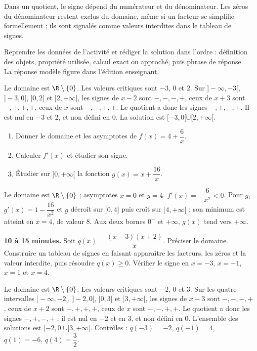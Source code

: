 \begin{summary}Dans un quotient, le signe dépend du numérateur et du dénominateur. Les zéros du dénominateur restent exclus du domaine, même si un facteur se simplifie formellement ; ils sont signalés comme valeurs interdites dans le tableau de signes.\end{summary}

\begin{example}
Reprendre les données de l'activité et rédiger la solution dans l'ordre : définition des objets, propriété utilisée, calcul exact ou approché, puis phrase de réponse. La réponse modèle figure dans l'édition enseignant.
\end{example}
\begin{solution}Le domaine est $\R\setminus\{0\}$. Les valeurs critiques sont $-3$, $0$ et $2$. Sur $]-\infty,-3[$, $]-3,0[$, $]0,2[$ et $]2,+\infty[$, les signes de $x-2$ sont $-,-,-,+$, ceux de $x+3$ sont $-,+,+,+$, ceux de $x$ sont $-,-,+,+$. Le quotient a donc les signes $-,+,-,+$. Il est nul en $-3$ et $2$, et non défini en $0$. La solution est $[-3,0[\cup[2,+\infty[$.\end{solution}

\begin{exercise}[essentiel]
\begin{enumerate}\item Donner le domaine et les asymptotes de $f(x)=4+\dfrac{6}x$.\item Calculer $f'(x)$ et étudier son signe.\item Étudier sur $]0,+\infty[$ la fonction $g(x)=x+\dfrac{16}x$.\end{enumerate}
\end{exercise}
\begin{solution}Le domaine est $\R\setminus\{0\}$ ; asymptotes $x=0$ et $y=4$. $f'(x)=-\dfrac{6}{x^2}<0$. Pour $g$, $g'(x)=1-\dfrac{16}{x^2}$ et $g$ décroît sur $]0,4]$ puis croît sur $[4,+\infty[$ ; son minimum est atteint en $x=4$, de valeur $8$. Aux deux bornes $0^+$ et $+\infty$, $g(x)$ tend vers $+\infty$.\end{solution}


\begin{homework}\textbf{10 à 15 minutes.} Soit $q(x)=\dfrac{(x-3)(x+2)}x$. Préciser le domaine. Construire un tableau de signes en faisant apparaître les facteurs, les zéros et la valeur interdite, puis résoudre $q(x)\geq0$. Vérifier le signe en $x=-3$, $x=-1$, $x=1$ et $x=4$.\end{homework}
\begin{solution}Le domaine est $\R\setminus\{0\}$. Les valeurs critiques sont $-2$, $0$ et $3$. Sur les quatre intervalles $]-\infty,-2[$, $]-2,0[$, $]0,3[$ et $]3,+\infty[$, les signes de $x-3$ sont $-,-,-,+$, ceux de $x+2$ sont $-,+,+,+$, ceux de $x$ sont $-,-,+,+$. Le quotient a donc les signes $-,+,-,+$ ; il est nul en $-2$ et en $3$, et non défini en $0$. L'ensemble des solutions est $[-2,0[\cup[3,+\infty[$. Contrôles : $q(-3)=-2$, $q(-1)=4$, $q(1)=-6$, $q(4)=\dfrac32$.\end{solution}

